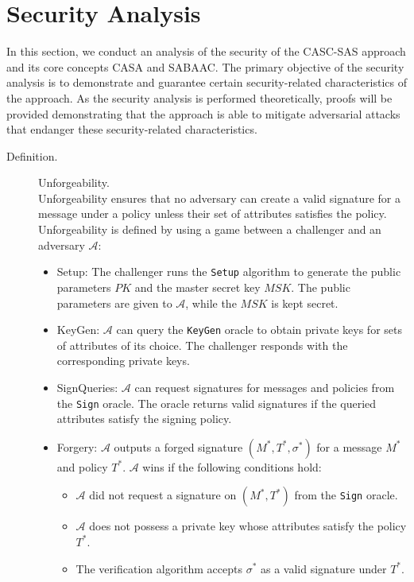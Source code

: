 \section{Security Analysis}
In this section, we conduct an analysis of the security of the CASC-SAS approach and its core concepts CASA and SABAAC.
The primary objective of the security analysis is to demonstrate and guarantee certain security-related characteristics of the approach.
As the security analysis is performed theoretically, proofs will be provided demonstrating that the approach is able to mitigate adversarial attacks that endanger these security-related characteristics.
\begin{description}
    \item[Definition.] Unforgeability.\\
    Unforgeability ensures that no adversary can create a valid signature for a message under a policy unless their set of attributes satisfies the policy.
    Unforgeability is defined by using a game between a challenger and an adversary $\mathcal{A}$:
    \begin{itemize}
        \item Setup: The challenger runs the \texttt{Setup} algorithm to generate the public parameters $PK$ and the master secret key $MSK$.
        The public parameters are given to $\mathcal{A}$, while the $MSK$ is kept secret.

        \item KeyGen: $\mathcal{A}$ can query the \texttt{KeyGen} oracle to obtain private keys for sets of attributes of its choice.
        The challenger responds with the corresponding private keys.

        \item SignQueries: $\mathcal{A}$ can request signatures for messages and policies from the \texttt{Sign} oracle.
        The oracle returns valid signatures if the queried attributes satisfy the signing policy.

        \item Forgery: $\mathcal{A}$ outputs a forged signature $(M^*, T^*, \sigma^*)$ for a message $M^*$ and policy $T^*$.
        $\mathcal{A}$ wins if the following conditions hold:
        \begin{itemize}
            \item $\mathcal{A}$ did not request a signature on $(M^*, T^*)$ from the \texttt{Sign} oracle.
            \item $\mathcal{A}$ does not possess a private key whose attributes satisfy the policy $T^*$.
            \item The verification algorithm accepts $\sigma^*$ as a valid signature under $T^*$.
        \end{itemize}
    \end{itemize}


\end{description}
